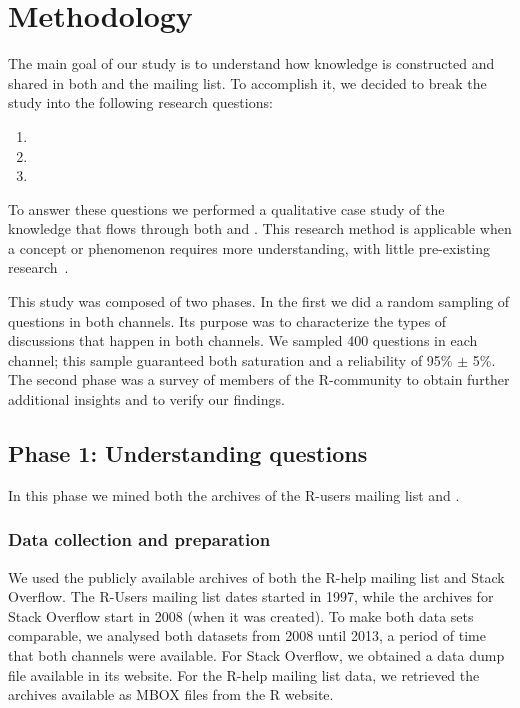 \section{Methodology}
\label{cha:methodology}

The main goal of our study is to understand how knowledge is constructed and shared in both \SO and the \RH mailing list. To accomplish it, we decided to break
the study into the 
following research questions:
    \begin{enumerate}[label=\bfseries{RQ-\arabic*.},itemsep=3pt, topsep=2pt, leftmargin=3em, parsep=0pt]
        \item \rqa
        \item \rqb
        \item \rqc
     \end{enumerate}

To answer these questions we performed a qualitative case study of the knowledge that flows through both \RH and \SO. 
This research method is applicable when a concept or phenomenon requires more understanding, with little pre-existing research~\cite{Creswell2009}.

This study was composed
of two phases. In the first we did a random sampling of questions in both channels. Its purpose was to characterize the types of discussions that happen in both
channels. We sampled 400 questions in each channel; this sample guaranteed both saturation and a reliability of 95\% $\pm$ 5\%. The second phase was a survey of members of the R-community to obtain further additional insights and to verify our findings. 


\subsection{Phase 1: Understanding questions} 
\label{sec:studyDesign}

In this phase we mined both the archives of the R-users mailing list and \SO.

\subsubsection{Data collection and preparation}
\label{subsec:preparation}

We used the publicly available archives of both	the R-help mailing list and Stack Overflow. The R-Users mailing list dates started in 1997, while
the archives for Stack Overflow start in 2008 (when it was created).
To make both data sets comparable, we analysed both datasets from 2008 until 2013, a period of time that both channels were available.
For Stack Overflow, we obtained a data dump file available in its website. For the R-help mailing list data, we retrieved the archives available as MBOX files from the R website.

